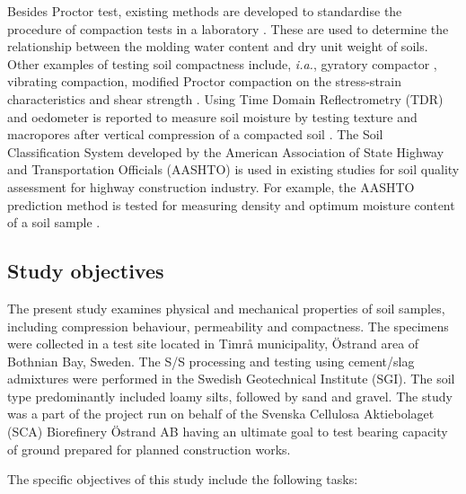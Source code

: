 \documentclass{amestyle}
\begin{document}
Besides Proctor test, existing methods are developed to standardise the procedure of compaction tests in a laboratory \cite{ASTM2007,ASTM2009}. These are used to determine the relationship between the molding water content and dry unit weight of soils. Other examples of testing soil compactness include, \emph{i.a.}, gyratory compactor \cite{Leeetal2007}, vibrating compaction, modified Proctor compaction on the stress-strain characteristics and shear strength \cite{Long}. Using Time Domain Reflectrometry (TDR) and oedometer is reported to measure soil moisture by testing texture and macropores after vertical compression of a compacted soil \cite{Alaoui}. The Soil Classification System developed by the American Association of State Highway and Transportation Officials (AASHTO) is used in existing studies for soil quality assessment for highway construction industry. For example, the AASHTO prediction method is tested for measuring density and optimum moisture content of a soil sample \cite{Livneh}. 

\newpage
\subsection{Study objectives} 
The present study examines physical and mechanical properties of soil samples, including compression behaviour, permeability and compactness. The specimens were collected in a test site located in Timrå municipality, Östrand area of Bothnian Bay, Sweden. The S/S processing and testing using cement/slag admixtures were performed in the Swedish Geotechnical Institute (SGI). The soil type predominantly included loamy silts, followed by sand and gravel. The study was a part of the project run on behalf of the Svenska Cellulosa Aktiebolaget (SCA) Biorefinery Östrand AB having an ultimate goal to test bearing capacity of ground prepared for planned construction works. 

The specific objectives of this study include the following tasks: 
\end{document}
